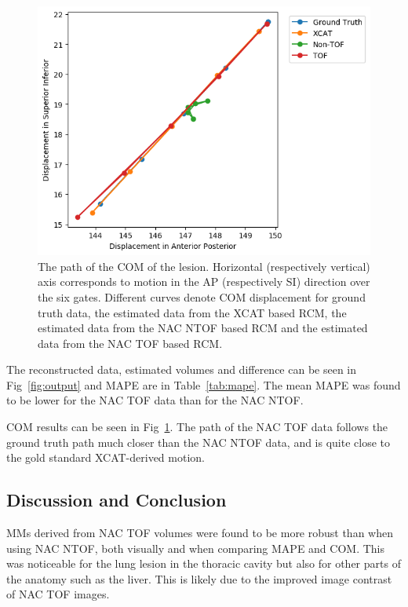             \begin{figure}
                \centering
                
                \includegraphics[width=1.0\linewidth]{figures/TOF.png}
                
                \captionsetup{singlelinecheck=false, justification=raggedright}
                \caption{The path of the \gls{COM} of the lesion. Horizontal (respectively vertical) axis corresponds to motion in the \gls{AP} (respectively \gls{SI}) direction over the six gates. Different curves denote \gls{COM} displacement for  ground truth data, the estimated data from the \gls{XCAT} based \gls{RCM}, the estimated data from the \gls{NAC} \gls{NTOF} based \gls{RCM} and the estimated data from the \gls{NAC} \gls{TOF} based \gls{RCM}.} \label{fig:com_graph}
            \end{figure}
            
             The reconstructed data, estimated volumes and difference can be seen in Fig~\ref{fig:output} and \gls{MAPE} are in Table~\ref{tab:mape}. The mean \gls{MAPE} was found to be lower for the \gls{NAC} \gls{TOF} data than for the \gls{NAC} \gls{NTOF}.
            
             \gls{COM} results can be seen in Fig~\ref{fig:com_graph}. The path of the \gls{NAC} \gls{TOF} data follows the ground truth path much closer than the \gls{NAC} \gls{NTOF} data, and is quite close to the gold standard \gls{XCAT}-derived motion.
            
        \subsection{Discussion and Conclusion} \label{impact_of_tof_on_respiratory_motion_modelling_using_nac_pet_discussion_and_conclusion}
            \gls{MM}s derived from \gls{NAC} \gls{TOF} volumes were found to be more robust than when using \gls{NAC} \gls{NTOF}, both visually and when comparing \gls{MAPE} and \gls{COM}. This was noticeable for the lung lesion in the thoracic cavity but also for other parts of the anatomy such as the liver. This is likely due to the improved image contrast of \gls{NAC} \gls{TOF} images.

